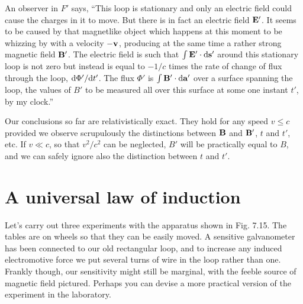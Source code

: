 An observer in $F'$ says, ``This loop is stationary and only an electric
field could cause the charges in it to move. But there is in fact an
electric field $\mathbf{E}'$. It seems to be caused by that magnetlike object
which happens at this moment to be whizzing by with a velocity $-\mathbf{v}$,
producing at the same time a rather strong magnetic field $\mathbf{B}'$. The
electric field is such that $\int\mathbf{E}'\cdot\textup{d}\mathbf{s}'$ around this stationary loop is not
zero but instead is equal to $-1/c$ times the rate of change of flux
through the loop, $\textup{d}\Phi'/\textup{d} t'$. The flux $\Phi'$ is $\int\mathbf{B}'\cdot\textup{d}\mathbf{a}'$ over a surface
spanning the loop, the values of $B'$ to be measured all over this surface
at some one instant $t'$, by my clock.''

Our conclusions so far are relativistically exact. They hold for
any speed $v \le c$ provided we observe scrupulously the distinctions
between $\mathbf{B}$ and $\mathbf{B}'$, $t$ and $t'$, etc. If $v \ll c$, so that $v^2/c^2$ can be
neglected, $B'$ will be practically equal to $B$, and we can safely ignore
also the distinction between $t$ and $t'$.

\section{A universal law of induction}

Let's carry out three experiments with the apparatus shown in
Fig. 7.15. The tables are on wheels so that they can be easily moved.
A sensitive galvanometer has been connected to our old rectangular
loop, and to increase any induced electromotive force we put several
turns of wire in the loop rather than one. Frankly though, our
sensitivity might still be marginal, with the feeble source of magnetic
field pictured. Perhaps you can devise a more practical version of
the experiment in the laboratory.

